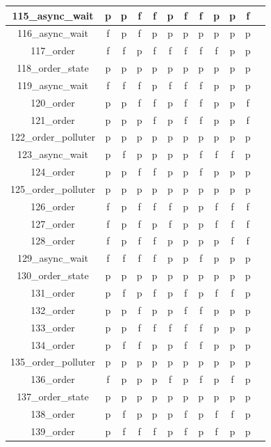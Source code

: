 \documentclass[
fancyheadings, %
%
%
]{stsreprt}
\begin{document}
\begin{longtable}{|c|c|c|c|c|c|c|c|c|c|c|c|}
\hline
115\_async\_wait & p & p & f & f & p & f & f & p & p & f \\
\hline
116\_async\_wait & f & p & f & p & p & p & p & p & p & p \\
\hline
117\_order & f & f & p & f & f & f & f & f & p & p \\
\hline
118\_order\_state & p & p & p & p & p & p & p & p & p & p \\
\hline
119\_async\_wait & f & f & f & p & f & f & f & p & p & p \\
\hline
120\_order & p & p & f & f & p & f & f & p & p & f \\
\hline
121\_order & p & p & p & f & p & f & f & p & p & f \\
\hline
122\_order\_polluter & p & p & p & p & p & p & p & p & p & p \\
\hline
123\_async\_wait & p & f & p & p & p & p & f & f & f & p \\
\hline
124\_order & p & p & f & f & p & p & f & p & p & p \\
\hline
125\_order\_polluter & p & p & p & p & p & p & p & p & p & p \\
\hline
126\_order & f & p & f & f & f & p & p & f & f & f \\
\hline
127\_order & f & p & f & p & f & p & p & f & f & f \\
\hline
128\_order & f & p & f & f & p & p & p & p & f & f \\
\hline
129\_async\_wait & f & f & f & f & p & p & f & p & p & p \\
\hline
130\_order\_state & p & p & p & p & p & p & p & p & p & p \\
\hline
131\_order & p & f & p & f & p & f & p & f & f & p \\
\hline
132\_order & p & p & f & p & p & f & f & p & p & p \\
\hline
133\_order & p & p & f & f & f & f & f & p & p & p \\
\hline
134\_order & p & f & f & p & p & f & f & p & p & p \\
\hline
135\_order\_polluter & p & p & p & p & p & p & p & p & p & p \\
\hline
136\_order & f & p & p & p & f & p & f & p & f & p \\
\hline
137\_order\_state & p & p & p & p & p & p & p & p & p & p \\
\hline
138\_order & p & f & p & p & p & f & p & f & f & p \\
\hline
139\_order & p & f & f & f & p & f & p & f & p & p \\

\end{longtable}
\end{document}
